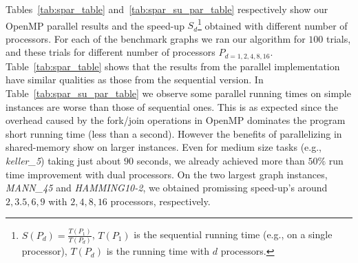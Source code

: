 \documentclass[11pt]{article}
\begin{document}
Tables~\ref{tab:spar_table} and~\ref{tab:spar_su_par_table} respectively show our OpenMP parallel results and the speed-up $S_d$\footnote{$S(P_d) = \frac{T(P_1)}{T(P_d)}$, $T(P_1)$ is the sequential running time (e.g., on a single processor), $T(P_d)$ is the running time with $d$ processors.} obtained with different number of processors. For each of the benchmark graphs we ran our algorithm for $100$ trials, and these trials for different number of processors $P_{d=1,2,4,8,16}$.  Table~\ref{tab:spar_table} shows that the results from the parallel implementation have similar qualities as those from the sequential version.  In Table~\ref{tab:spar_su_par_table} we observe some parallel running times on simple instances are worse than those of sequential ones. This is as expected since the overhead caused by the fork/join operations in OpenMP dominates the program short running time (less than a second).  However the benefits of parallelizing in shared-memory show on larger instances.  Even for medium size tasks (e.g., \textit{keller\_5}) taking just about $90$ seconds, we already achieved more than $50\%$ run time improvement with dual processors.  On the two largest graph instances, \textit{MANN\_45} and \textit{HAMMING10-2}, we obtained promissing speed-up's around $2, 3.5, 6, 9$ with $2,4,8,16$ processors, respectively.
\end{document}
